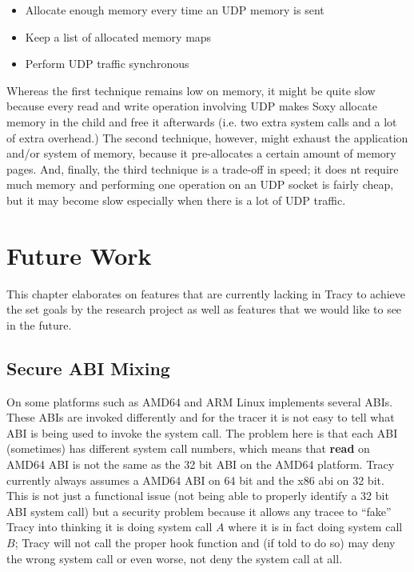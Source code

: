 \documentclass[a4paper, 10pt]{report}
\begin{document}
\begin{itemize}
\item Allocate enough memory every time an UDP memory is sent
\item Keep a list of allocated memory maps
\item Perform UDP traffic synchronous
\end{itemize}

Whereas the first technique remains low on memory, it might be quite slow
because every read and write operation involving UDP makes Soxy allocate
memory in the child and free it afterwards (i.e. two extra system calls and a
lot of extra overhead.) The second technique, however, might exhaust the
application and/or system of memory, because it pre-allocates a certain amount
of memory pages. And, finally, the third technique is a trade-off in speed; it
does nt require much memory and performing one operation on an UDP socket is
fairly cheap, but it may become slow especially when there is a lot of UDP
traffic.

\chapter{Future Work}

This chapter elaborates on features that are currently lacking in Tracy to
achieve the set goals by the research project as well as features that we would
like to see in the future.

\section{Secure ABI Mixing}
\label{secure-abi}

On some platforms such as AMD64 and ARM Linux implements several ABIs.
These ABIs are invoked differently and for the tracer it is not easy to
tell what ABI is being used to invoke the system call.
The problem here is that each ABI (sometimes) has different system call
numbers, which means that \textbf{read} on AMD64 ABI is not the same
as the 32 bit ABI on the AMD64 platform. Tracy currently always assumes
a AMD64 ABI on 64 bit and the x86 abi on 32 bit.
This is not just a functional issue (not being able to properly identify a 32
bit ABI system call) but a security problem because it
allows any tracee to ``fake'' Tracy into thinking it is doing system call $A$
where it is in fact doing system call $B$; Tracy will not call the proper hook
function and (if told to do so) may deny the wrong system call or even worse,
not deny the system call at all. \\
\end{document}
